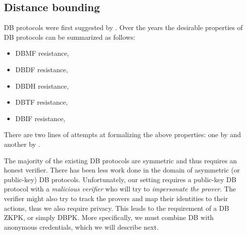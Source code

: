 \subsection{Distance bounding}%
\label{DistanceBounding}

\Ac{DB} protocols were first suggested by \citet{DistanceBounding}.
Over the years the desirable properties of \ac{DB} protocols can be summarized 
as follows:
\begin{itemize}
  \item \ac{DBMF} resistance,
  \item \ac{DBDF} resistance,
  \item \ac{DBDH} resistance,
  \item \ac{DBTF} resistance,
  \item \ac{DBIF} resistance,
\end{itemize}
There are two lines of attempts at formalizing the above properties: one by 
\citet{DB-BMV} and another by \citet{DB-DFKO}.

The majority of the existing \ac{DB} protocols are symmetric and thus requires 
an honest verifier.
There has been less work done in the domain of asymmetric (or public-key) 
\ac{DB} protocols.
Unfortunately, our setting requires a public-key \ac{DB} protocol with a 
\emph{malicious verifier} who will try to \emph{impersonate the prover}.
The verifier might also try to track the provers and map their identities to 
their actions, thus we also require privacy.
This leads to the requirement of a \ac{DB} \ac{ZKPK}, or simply \ac{DBPK}.
More specifically, we must combine \ac{DB} with anonymous credentials, which we 
will describe next.
